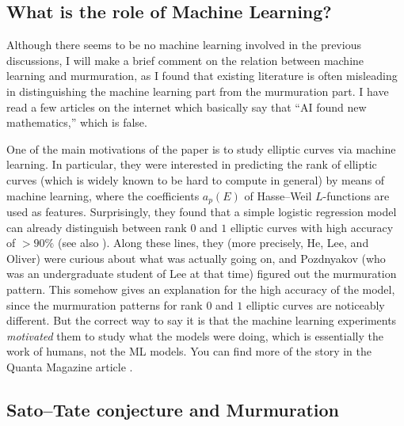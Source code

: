 \subsection{What is the role of Machine Learning?}

Although there seems to be no machine learning involved in the previous discussions, I will make a brief comment on the relation between machine learning and murmuration, as I found that existing literature is often misleading in distinguishing the machine learning part from the murmuration part.
I have read a few articles on the internet which basically say that ``AI found new mathematics,'' which is false.

One of the main motivations of the paper \cite{he2024murmurations} is to study elliptic curves via machine learning.
In particular, they were interested in predicting the rank of elliptic curves (which is widely known to be hard to compute in general) by means of machine learning, where the coefficients $a_p(E)$ of Hasse--Weil $L$-functions are used as features.
Surprisingly, they found that a simple logistic regression model can already distinguish between rank $0$ and $1$ elliptic curves with high accuracy of $>90\%$ (see also \cite{he2023machine}).
Along these lines, they (more precisely, He, Lee, and Oliver) were curious about what was actually going on, and Pozdnyakov (who was an undergraduate student of Lee at that time) figured out the murmuration pattern.
This somehow gives an explanation for the high accuracy of the model, since the murmuration patterns for rank $0$ and $1$ elliptic curves are noticeably different.
But the correct way to say it is that the machine learning experiments \emph{motivated} them to study what the models were doing, which is essentially the work of humans, not the ML models.
You can find more of the story in the Quanta Magazine article \cite{chiou2024elliptic}.


\subsection{Sato--Tate conjecture and Murmuration}



